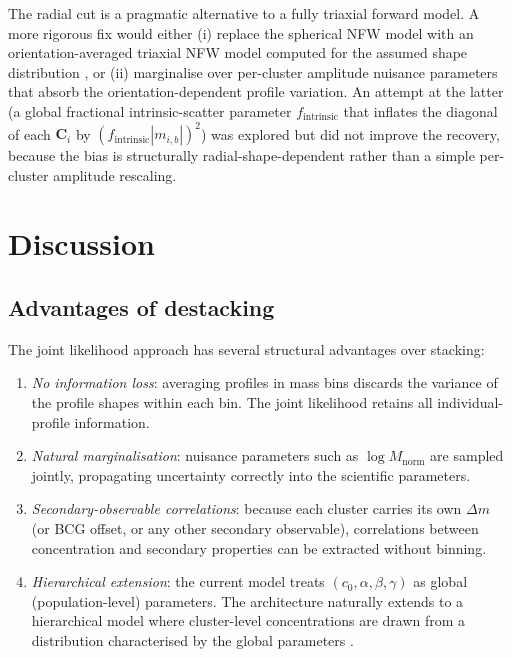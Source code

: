 \documentclass[12pt,a4paper]{article}
\begin{document}
The radial cut is a pragmatic alternative to a fully triaxial forward model.
A more rigorous fix would either (i) replace the spherical NFW model with an
orientation-averaged triaxial NFW model computed for the assumed shape
distribution \citep{Oguri2012,Corless2007}, or (ii) marginalise over per-cluster
amplitude nuisance parameters that absorb the orientation-dependent profile
variation.  An attempt at the latter (a global fractional intrinsic-scatter
parameter $f_\mathrm{intrinsic}$ that inflates the diagonal of each $\mathbf{C}_i$
by $(f_\mathrm{intrinsic}|m_{i,b}|)^2$) was explored but did not improve the
recovery, because the bias is structurally radial-shape-dependent rather than a
simple per-cluster amplitude rescaling.

\section{Discussion}
\label{sec:discussion}

\subsection{Advantages of destacking}

The joint likelihood approach has several structural advantages over stacking:
\begin{enumerate}
  \item \textit{No information loss}: averaging profiles in mass bins discards
    the variance of the profile shapes within each bin.  The joint likelihood
    retains all individual-profile information.
  \item \textit{Natural marginalisation}: nuisance parameters such as
    $\log M_\mathrm{norm}$ are sampled jointly, propagating uncertainty
    correctly into the scientific parameters.
  \item \textit{Secondary-observable correlations}: because each cluster carries
    its own $\Delta m$ (or BCG offset, or any other secondary observable),
    correlations between concentration and secondary properties can be extracted
    without binning.
  \item \textit{Hierarchical extension}: the current model treats
    $(c_0, \alpha, \beta, \gamma)$ as global (population-level) parameters.
    The architecture naturally extends to a hierarchical model where cluster-level
    concentrations are drawn from a distribution characterised by the global
    parameters \citep{Mantz2015,McClintock2019}.
\end{enumerate}
\end{document}

